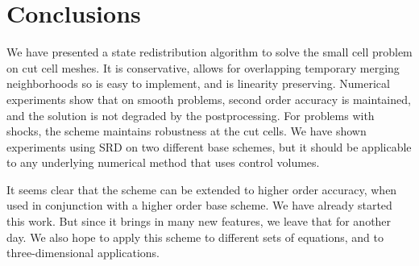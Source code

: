 \section{Conclusions}\label{sec:conc}
We have presented a  state redistribution algorithm to solve the small cell problem on cut cell meshes.  It is conservative, allows for overlapping temporary merging neighborhoods so is easy to implement, and is linearity preserving.   
Numerical experiments show that on smooth problems, second order accuracy is maintained, and the solution is not degraded by the postprocessing. For problems with shocks, the scheme maintains robustness at the cut cells.
We have shown experiments using SRD on two different base schemes, but it should be 
applicable to any underlying numerical method that uses control volumes. 

It seems clear that the scheme can be extended to higher order accuracy, when used in conjunction with a 
higher order base scheme. We have already started this work. But since it brings in many new features, we leave that for another day.  We also hope to apply this scheme to different sets of equations, and to three-dimensional applications.
